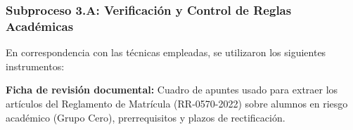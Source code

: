 \subsubsection{Subproceso 3.A: Verificación y Control de Reglas Académicas}

En correspondencia con las t\'ecnicas empleadas, se utilizaron los siguientes instrumentos:

\textbf{Ficha de revisión documental:} Cuadro de apuntes usado para extraer los artículos del Reglamento de Matrícula (RR-0570-2022) sobre alumnos en riesgo académico (Grupo Cero), prerrequisitos y plazos de rectificación.
